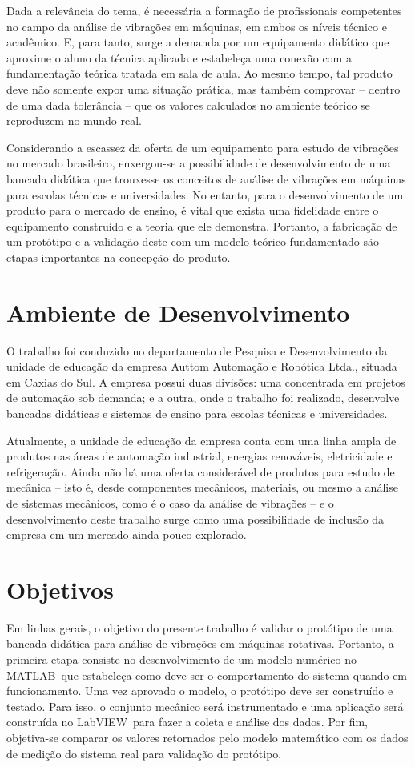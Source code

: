 \documentclass[12pt,openright,twoside,a4paper,
	chapter=TITLE,section=TITLE,
	english,brazil]{abntex2}
\begin{document}
	Dada a relevância do tema, é necessária a formação de profissionais competentes no campo da análise de vibrações em máquinas, em ambos os níveis técnico e acadêmico. E, para tanto, surge a demanda por um equipamento didático que aproxime o aluno da técnica aplicada e estabeleça uma conexão com a fundamentação teórica tratada em sala de aula. Ao mesmo tempo, tal produto deve não somente expor uma situação prática, mas também comprovar -- dentro de uma dada tolerância -- que os valores calculados no ambiente teórico se reproduzem no mundo real.
	
	Considerando a escassez da oferta de um equipamento para estudo de vibrações no mercado brasileiro, enxergou-se a possibilidade de desenvolvimento de uma bancada didática que trouxesse os conceitos de análise de vibrações em máquinas para escolas técnicas e universidades. No entanto, para o desenvolvimento de um produto para o mercado de ensino, é vital que exista uma fidelidade entre o equipamento construído e a teoria que ele demonstra. Portanto, a fabricação de um protótipo e a validação deste com um modelo teórico fundamentado são etapas importantes na concepção do produto.
	
	\section{Ambiente de Desenvolvimento}	
	O trabalho foi conduzido no departamento de Pesquisa e Desenvolvimento da unidade de educação da empresa Auttom Automação e Robótica Ltda., situada em Caxias do Sul. A empresa possui duas divisões: uma concentrada em projetos de automação sob demanda; e a outra, onde o trabalho foi realizado, desenvolve bancadas didáticas e sistemas de ensino para escolas técnicas e universidades.
	
	Atualmente, a unidade de educação da empresa conta com uma linha ampla de produtos nas áreas de automação industrial, energias renováveis, eletricidade e refrigeração. Ainda não há uma oferta considerável de produtos para estudo de mecânica -- isto é, desde componentes mecânicos, materiais, ou mesmo a análise de sistemas mecânicos, como é o caso da análise de vibrações -- e o desenvolvimento deste trabalho surge como uma possibilidade de inclusão da empresa em um mercado ainda pouco explorado.
	
	\section{Objetivos}
	Em linhas gerais, o objetivo do presente trabalho é validar o protótipo de uma bancada didática para análise de vibrações em máquinas rotativas. Portanto, a primeira etapa consiste no desenvolvimento de um modelo numérico no MATLAB\textsuperscript\textregistered\ que estabeleça como deve ser o comportamento do sistema quando em funcionamento. Uma vez aprovado o modelo, o protótipo deve ser construído e testado. Para isso, o conjunto mecânico será instrumentado e uma aplicação será construída no LabVIEW\textsuperscript\textregistered\ para fazer a coleta e análise dos dados. Por fim, objetiva-se comparar os valores retornados pelo modelo matemático com os dados de medição do sistema real para validação do protótipo.
	
\end{document}
